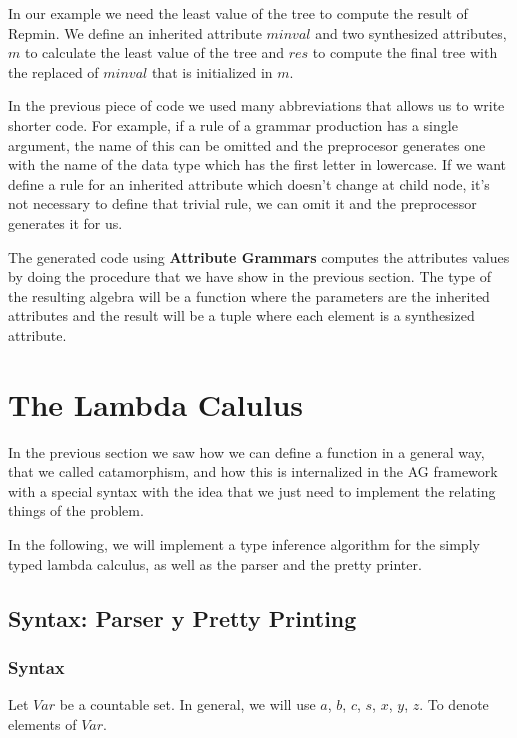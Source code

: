 \documentclass[a4paper,10pt]{article}
\begin{document}
In our example we need the least value of the tree to compute the result of Repmin. We define
an inherited attribute $minval$ and two synthesized attributes, $m$ to calculate the least value
of the tree and $res$ to compute the final tree with the replaced of $minval$ that is initialized
in $m$.
  
In the previous piece of code we used many abbreviations that allows us to write shorter code.
For example, if a rule of a grammar production has a single argument, the name of this can be omitted and the preprocesor generates 
one with the name of the data type which has the first letter in lowercase. 
If we want define a rule for an inherited attribute which doesn't change at child node, 
it's not necessary to define that trivial rule, we can omit it and the preprocessor generates it for us.

The generated code using \textbf{Attribute Grammars} computes the attributes values by doing the
procedure that we have show in the previous section. The type of the resulting algebra will be a function
where the parameters are the inherited attributes and the result will be a tuple where each element
is a synthesized attribute.
  
\section{The Lambda Calulus}

In the previous section we saw how we can define a function in a general way, that we called
catamorphism, and how this is internalized in the AG framework with a special syntax
with the idea that we just need to implement the relating things of the problem.

In the following, we will implement a type inference algorithm for the simply typed lambda
calculus, as well as the parser and the pretty printer.

\subsection{Syntax: Parser y Pretty Printing}

\subsubsection{Syntax}

Let $Var$ be a countable set. In general, we will use $a$, $b$, $c$, $s$, $x$, $y$, $z$. To
denote elements of $Var$.
\end{document}
